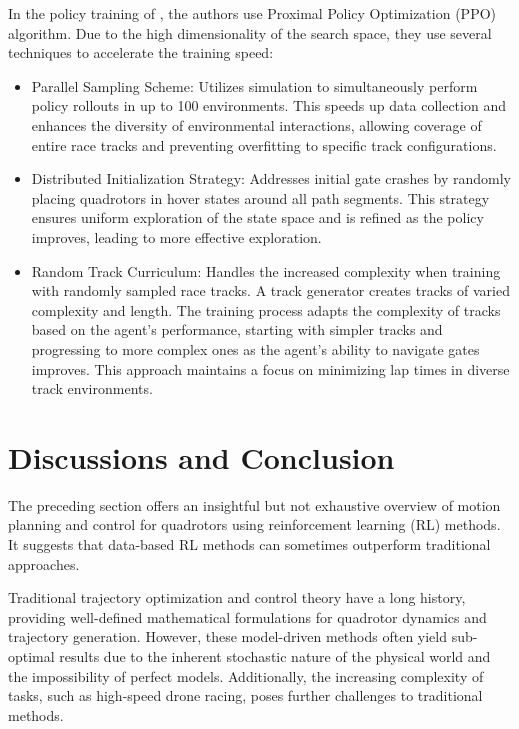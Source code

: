 \documentclass{article}
\begin{document}
In the policy training of \textcite{song2021autonomous}, the authors
use Proximal Policy Optimization (PPO) algorithm. 
Due to the high dimensionality of the search space, they use several techniques to accelerate the training speed:
\begin{itemize}
  \item Parallel Sampling Scheme: Utilizes simulation to simultaneously perform policy rollouts in up to 100 environments. This speeds up data collection and enhances the diversity of environmental interactions, allowing coverage of entire race tracks and preventing overfitting to specific track configurations.
  \item Distributed Initialization Strategy: Addresses initial gate crashes by randomly placing quadrotors in hover states around all path segments. This strategy ensures uniform exploration of the state space and is refined as the policy improves, leading to more effective exploration.
  \item Random Track Curriculum: Handles the increased complexity when training with randomly sampled race tracks. A track generator creates tracks of varied complexity and length. The training process adapts the complexity of tracks based on the agent's performance, starting with simpler tracks and progressing to more complex ones as the agent's ability to navigate gates improves. This approach maintains a focus on minimizing lap times in diverse track environments.
\end{itemize}




\section{Discussions and Conclusion}

The preceding section offers an insightful but not exhaustive overview of motion planning and control for quadrotors using reinforcement learning (RL) methods. It suggests that data-based RL methods can sometimes outperform traditional approaches.

Traditional trajectory optimization and control theory have a long history, providing well-defined mathematical formulations for quadrotor dynamics and trajectory generation. However, these model-driven methods often yield sub-optimal results due to the inherent stochastic nature of the physical world and the impossibility of perfect models. Additionally, the increasing complexity of tasks, such as high-speed drone racing, poses further challenges to traditional methods.
\end{document}
